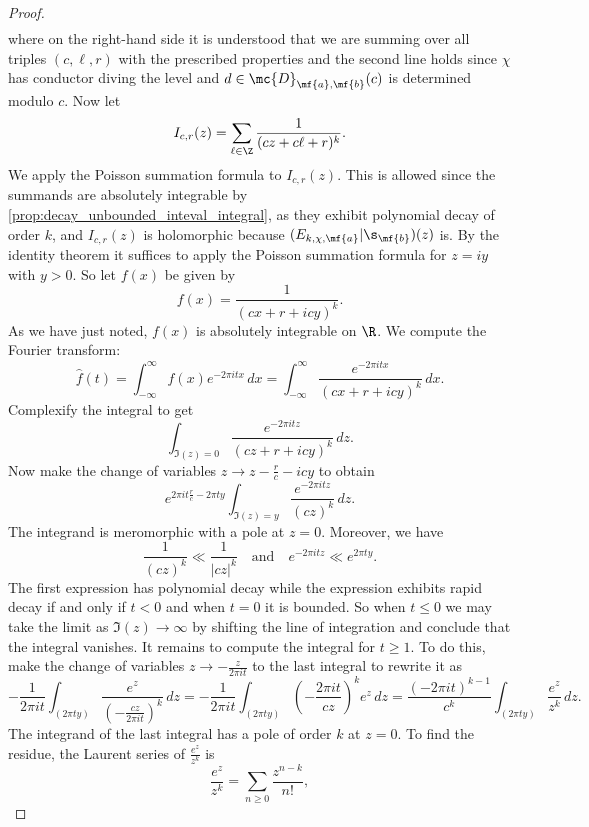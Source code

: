 \begin{proof}
\begin{align*}
      \end{align*}
      where on the right-hand side it is understood that we are summing over all triples $(c,\ell,r)$ with the prescribed properties and the second line holds since $\chi$ has conductor diving the level and $d \in \mc{D}_{\mf{a},\mf{b}}(c)$ is determined modulo $c$. Now let
      \[
        I_{c,r}(z) = \sum_{\ell \in \Z}\frac{1}{(cz+c\ell+r)^{k}}.
      \]
      We apply the Poisson summation formula to $I_{c,r}(z)$. This is allowed since the summands are absolutely integrable by \cref{prop:decay_unbounded_inteval_integral}, as they exhibit polynomial decay of order $k$, and $I_{c,r}(z)$ is holomorphic because $(E_{k,\chi,\mf{a}}|\s_{\mf{b}})(z)$ is. By the identity theorem it suffices to apply the Poisson summation formula for $z = iy$ with $y > 0$. So let $f(x)$ be given by
      \[
        f(x) = \frac{1}{(cx+r+icy)^{k}}.
      \]
      As we have just noted, $f(x)$ is absolutely integrable on $\R$. We compute the Fourier transform:
      \[
        \hat{f}(t) = \int_{-\infty}^{\infty}f(x)e^{-2\pi itx}\,dx = \int_{-\infty}^{\infty}\frac{e^{-2\pi itx}}{(cx+r+icy)^{k}}\,dx.
      \]
      Complexify the integral to get
      \[
        \int_{\Im(z) = 0}\frac{e^{-2\pi itz}}{(cz+r+icy)^{k}}\,dz.
      \]
      Now make the change of variables $z \to z-\frac{r}{c}-icy$ to obtain
      \[
        e^{2\pi it\frac{r}{c}-2\pi ty}\int_{\Im(z) = y}\frac{e^{-2\pi itz}}{(cz)^{k}}\,dz.
      \]
      The integrand is meromorphic with a pole at $z = 0$. Moreover, we have
      \[
        \frac{1}{(cz)^{k}} \ll \frac{1}{|cz|^{k}} \quad \text{and} \quad e^{-2\pi itz} \ll e^{2\pi ty}.
      \]
      The first expression has polynomial decay while the expression exhibits rapid decay if and only if $t < 0$ and when $t = 0$ it is bounded. So when $t \le 0$ we may take the limit as $\Im(z) \to \infty$ by shifting the line of integration and conclude that the integral vanishes. It remains to compute the integral for $t \ge 1$. To do this, make the change of variables $z \to -\frac{z}{2\pi it}$ to the last integral to rewrite it as
      \[
        -\frac{1}{2\pi it}\int_{(2\pi ty)}\frac{e^{z}}{\left(-\frac{cz}{2\pi it}\right)^{k}}\,dz = -\frac{1}{2\pi it}\int_{(2\pi ty)}\left(-\frac{2\pi it}{cz}\right)^{k}e^{z}\,dz = \frac{(-2\pi it)^{k-1}}{c^{k}}\int_{(2\pi ty)}\frac{e^{z}}{z^{k}}\,dz.
      \]
      The integrand of the last integral has a pole of order $k$ at $z = 0$. To find the residue, the Laurent series of $\frac{e^{z}}{z^{k}}$ is
      \[
        \frac{e^{z}}{z^{k}} = \sum_{n \ge 0}\frac{z^{n-k}}{n!},
      \]

\end{proof}
